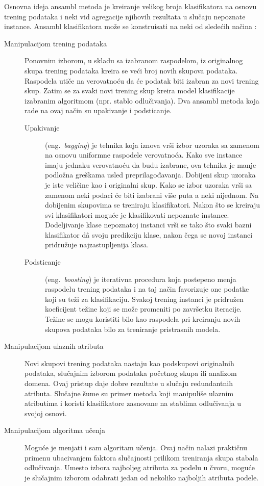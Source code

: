 \documentclass[12pt,oneside]{memoir}
\begin{document}
Osnovna ideja ansambl metoda je kreiranje velikog broja klasifikatora na osnovu trening podataka i neki vid agregacije njihovih rezultata u slučaju nepoznate instance. Ansambl klasifikatora može se konstruisati na neki od sledećih načina \cite{mitic}:
\begin{description}
\item[Manipulacijom trening podataka] Ponovnim izborom, u skladu sa izabranom raspodelom, iz originalnog skupa trening podataka kreira se veći broj novih skupova podataka. Raspodela utiče na verovatnoću da će podatak biti izabran za novi trening skup. Zatim se za svaki novi trening skup kreira model klasifikacije izabranim algoritmom (npr. stablo odlučivanja). Dva ansambl metoda koja rade na ovaj način su upakivanje i podsticanje.
\begin{description}
\item[Upakivanje] (eng.~\textit{bagging}) je tehnika koja iznova vrši izbor uzoraka sa zamenom na osnovu uniformne raspodele verovatnoća. Kako sve instance imaju jednaku verovatnoću da budu izabrane, ova tehnika je manje podložna greškama usled preprilagođavanja. Dobijeni skup uzoraka je iste veličine kao i originalni skup. Kako se izbor uzoraka vrši sa zamenom neki podaci će biti izabrani više puta a neki nijednom. Na dobijenim skupovima se treniraju klasifikatori. Nakon što se kreiraju svi klasifikatori moguće je klasifikovati nepoznate instance. Dodeljivanje klase nepoznatoj instanci vrši se tako što svaki bazni klasifikator d\^a svoju predikciju klase, nakon čega se novoj instanci pridružuje najzastupljenija klasa.
\item[Podsticanje] (eng.~\textit{boosting}) je iterativna procedura koja postepeno menja raspodelu trening podataka i na taj način favorizuje one podatke koji su teži za klasifikaciju. Svakoj trening instanci je pridružen koeficijent težine koji se može promeniti po završetku iteracije. Težine se mogu koristiti bilo kao raspodela pri kreiranju novih skupova podataka bilo za treniranje pristrasnih modela.
\end{description}
\item[Manipulacijom ulaznih atributa] Novi skupovi trening podataka nastaju kao podskupovi originalnih podataka, slučajnim izborom podataka početnog skupa ili analizom domena. Ovaj pristup daje dobre rezultate u slučaju redundantnih atributa. Slučajne šume su primer metoda koji manipuliše ulaznim atributima i koristi klasifikatore zasnovane na stablima odlučivanja u svojoj osnovi. 
\item[Manipulacijom algoritma učenja] Moguće je menjati i sam algoritam učenja. Ovaj način nalazi praktičnu primenu ubacivanjem faktora slučajnosti prilikom treniranja skupa stabala odlučivanja. Umesto izbora najboljeg atributa za podelu u čvoru, moguće je slučajnim izborom odabrati jedan od nekoliko najboljih atributa podele.

\end{description}
\end{document}
